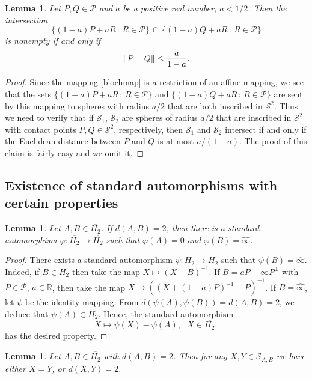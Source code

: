 \documentclass[10pt]{amsart}
\newtheorem{lemma}[theorem]{Lemma}
\theoremstyle{definition}
\theoremstyle{remark}
\numberwithin{subsection}{section}
\numberwithin{equation}{section}
\newcommand\cP{{\mathcal{P}}}
\newcommand\oH{{\overline{H_2}}}
\newcommand\oi{{\widehat{\infty}}}
\begin{document}
\begin{lemma}\label{mikar}
Let $P,Q \in \mathcal{P}$ and $a$ be a positive real number, $a < 1/2$. Then the intersection
\[
\{ (1-a) P + aR \, : \, R\in \mathcal{P} \} \, \cap \, \{ (1-a) Q + aR \, : \, R\in \mathcal{P} \}
\]
is nonempty if and only if
\[
\| P - Q \| \le { a \over 1-a }.
\]
\end{lemma}
\begin{proof}
Since the mapping \eqref{blochmap} is a restriction of an affine mapping, we see that the sets $\{ (1-a) P + aR \, : \, R\in \mathcal{P} \}$ and $\{ (1-a) Q + aR \, : \, R\in \mathcal{P} \}$ are sent by this mapping to spheres with radius $a/2$ that are both inscribed in $\mathcal{S}^2$.
Thus we need to verify that if
$\mathcal{S}_1$, $\mathcal{S}_2$ are spheres of radius $a/2$ that are inscribed in $\mathcal{S}^2$ with contact points $P, Q\in \mathcal{S}^2$, respectively, 
then $\mathcal{S}_1$ and $\mathcal{S}_2$ intersect if and only if the Euclidean distance between $P$ and $Q$ is at most $a/(1-a)$.
The proof of this claim is fairly easy and we omit it.
\end{proof}





\subsection{Existence of standard automorphisms with certain properties}\label{existence}
\begin{lemma}\label{pocelo}
Let $A,B \in \oH$. If $d(A,B) = 2$, then there is a standard automorphism $\varphi \colon \oH \to \oH$ such that $\varphi (A) = 0$ and $\varphi (B) = {\oi}$.
\end{lemma}
\begin{proof}
There exists a standard automorphism $\psi \colon \oH \to \oH$ such that $\psi (B) = {\oi}$. 
Indeed, if $B\in H_2$ then take the map $X\mapsto (X-B)^{-1}$. 
If $B=aP+\infty P^\perp$ with $P\in \cP$, $a\in \mathbb{R}$, then take the map $X\mapsto ((X+(1-a)P)^{-1}-P)^{-1}$.
If $B=\oi$, let $\psi$ be the identity mapping.
From $d(\psi (A), \psi (B)) = d(A,B) = 2$, we deduce that $\psi(A) \in H_2$. Hence, the standard automorphism
\[
X \mapsto \psi (X) - \psi (A), \ \ \ X \in \oH,
\]
has the desired property.
\end{proof}

\begin{lemma}\label{pjanck}
Let $A,B \in \oH$ with $d(A,B) =2$. Then for any $X,Y \in \mathcal{S}_{A,B}$ we have either $X=Y$, or $d(X,Y) =2$.
\end{lemma}
\end{document}
